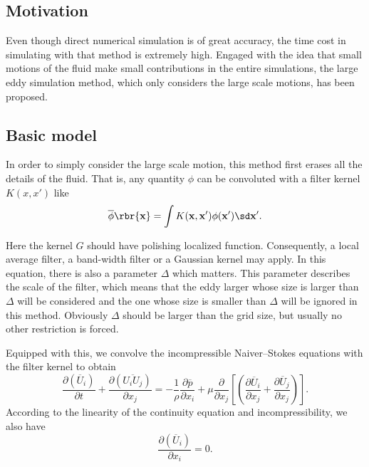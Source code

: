 \documentclass[english, nochinese]{pkupaper}
\begin{document}
\subsection{Motivation}

Even though direct numerical simulation is of great accuracy, the time cost in simulating with that method is extremely high. Engaged with the idea that small motions of the fluid make small contributions in the entire simulations, the large eddy simulation method, which only considers the large scale motions, has been proposed.

\subsection{Basic model}

In order to simply consider the large scale motion, this method first erases all the details of the fluid. That is, any quantity $\phi$ can be convoluted with a filter kernel $K(x, x')$ like %
\begin{equation}\label{Eq:Conv}
\overline{\phi} \rbr{\mathbf{x}} = \int K(\mathbf{x}, \mathbf{x}') \phi(\mathbf{x}')\sd \mathbf{x}'.
\end{equation}

Here the kernel $G$ should have polishing localized function. Consequently, a local average filter, a band-width filter or a Gaussian kernel may apply. In this equation, there is also a parameter $\Delta$ which matters. This parameter describes the scale of the filter, which means that the eddy larger whose size is larger than $\Delta$ will be considered and the one whose size is smaller than $\Delta$ will be ignored in this method. Obviously $\Delta$ should be larger than the grid size, but usually no other restriction is forced.

Equipped with this, we convolve the incompressible Naiver--Stokes equations with the filter kernel to obtain%
\begin{equation}\label{Eq:ConvKe}
\frac{\partial(\overline{U}_i)}{\partial t} + \frac{\partial(\overline{U_iU_j})}{\partial x_j} = -\frac{1}{\rho} \frac{\partial\overline{p}}{\partial x_i} +\mu \frac{\partial}{\partial x_j}\left[\left(\frac{\partial\overline{U}_i}{\partial x_j}+\frac{\partial\overline{U}_j}{\partial x_j}\right)\right].
\end{equation}
According to the linearity of the continuity equation and incompressibility, we also have
\begin{equation}
\frac{\partial(\overline{U}_i)}{\partial x_i} = 0.
\end{equation}
\end{document}

